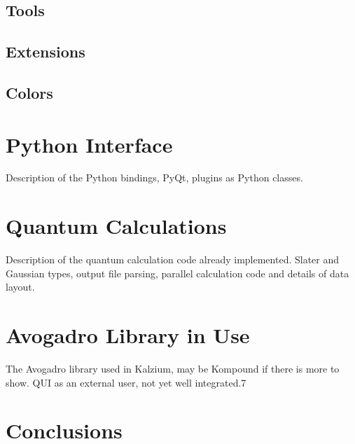 \documentclass{article}
\begin{document}
\subsection{Tools}

\subsection{Extensions}

\subsection{Colors} %

\section{Python Interface} %

Description of the Python bindings, PyQt, plugins as Python classes.

\section{Quantum Calculations}

Description of the quantum calculation code already implemented. Slater and Gaussian types, output file parsing, parallel calculation code and details of data layout.

\section{Avogadro Library in Use}

The Avogadro library used in Kalzium, may be Kompound if there is more to show. QUI as an external user, not yet well integrated.7

\section{Conclusions}



\end{document}
